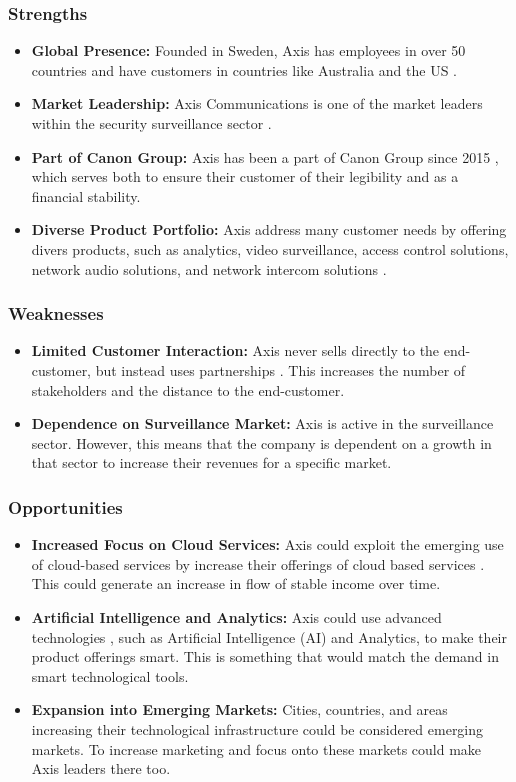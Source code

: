 \documentclass{article}
\begin{document}
\subsubsection{Strengths}
\begin{itemize}
    \item \textbf{Global Presence:} Founded in Sweden, Axis has employees in over 50 countries and have customers in countries like Australia and the US \cite{axis_about}.
    \item \textbf{Market Leadership:} Axis Communications is one of the market leaders within the security surveillance sector \cite{mckinsey2023}.
    \item \textbf{Part of Canon Group:} Axis has been a part of Canon Group since 2015 \cite{axis_about}, which serves both to ensure their customer of their legibility and as a financial stability.
    \item \textbf{Diverse Product Portfolio:} Axis address many customer needs by offering divers products, such as analytics, video surveillance, access control solutions, network audio solutions, and network intercom solutions \cite{axis_about}. 
\end{itemize}

\subsubsection{Weaknesses}
\begin{itemize}
    \item \textbf{Limited Customer Interaction:} Axis never sells directly to the end-customer, but instead uses partnerships \cite{axis_homepage}. This increases the number of stakeholders and the distance to the end-customer. 
    \item \textbf{Dependence on Surveillance Market:} Axis is active in the surveillance sector. However, this means that the company is dependent on a growth in that sector to increase their revenues for a specific market. 
\end{itemize}

\subsubsection{Opportunities}
\begin{itemize}
    \item \textbf{Increased Focus on Cloud Services:} Axis could exploit the emerging use of cloud-based services by increase their offerings of cloud based services \cite{aipix2023}. This could generate an increase in flow of stable income over time. 
    \item \textbf{Artificial Intelligence and Analytics:} Axis could use advanced technologies \cite{aipix2023}, such as Artificial Intelligence (AI) and Analytics, to make their product offerings smart. This is something that would match the demand in smart technological tools.
    \item \textbf{Expansion into Emerging Markets:} Cities, countries, and areas increasing their technological infrastructure could be considered emerging markets. To increase marketing and focus onto these markets could make Axis leaders there too. 
\end{itemize}
\end{document}
